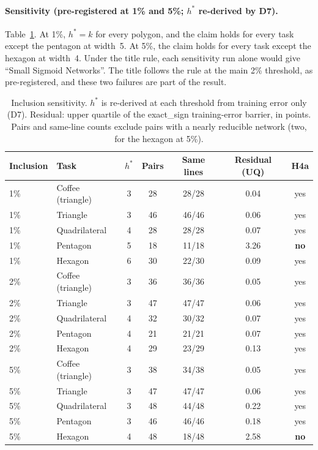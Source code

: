 \documentclass[11pt]{article}
\newcommand{\md}[1]{\textsf{#1}}
\begin{document}
\paragraph{Sensitivity (pre-registered at 1\% and 5\%; $h^*$ re-derived by D7).} Table~\ref{tab:v2sens}. At 1\%, $h^* = k$ for every polygon, and the claim holds for every task except the pentagon at width~5. At 5\%, the claim holds for every task except the hexagon at width~4. Under the title rule, each sensitivity run alone would give ``Small Sigmoid Networks''. The title follows the rule at the main 2\% threshold, as pre-registered, and these two failures are part of the result.

\begin{table}[t]
\centering\small
\caption{Inclusion sensitivity. $h^*$ is re-derived at each threshold from training error only (D7). Residual: upper quartile of the \md{exact\_sign} training-error barrier, in points. Pairs and same-line counts exclude pairs with a nearly reducible network (two, for the hexagon at 5\%).}
\label{tab:v2sens}
\begin{tabular}{@{}llccccc@{}}
\toprule
Inclusion & Task & $h^*$ & Pairs & Same lines & Residual (UQ) & H4a \\
\midrule
1\% & Coffee (triangle) & 3 & 28 & 28/28 & 0.04 & yes \\
1\% & Triangle & 3 & 46 & 46/46 & 0.06 & yes \\
1\% & Quadrilateral & 4 & 28 & 28/28 & 0.07 & yes \\
1\% & Pentagon & 5 & 18 & 11/18 & 3.26 & \textbf{no} \\
1\% & Hexagon & 6 & 30 & 22/30 & 0.09 & yes \\
\midrule
2\% & Coffee (triangle) & 3 & 36 & 36/36 & 0.05 & yes \\
2\% & Triangle & 3 & 47 & 47/47 & 0.06 & yes \\
2\% & Quadrilateral & 4 & 32 & 30/32 & 0.07 & yes \\
2\% & Pentagon & 4 & 21 & 21/21 & 0.07 & yes \\
2\% & Hexagon & 4 & 29 & 23/29 & 0.13 & yes \\
\midrule
5\% & Coffee (triangle) & 3 & 38 & 34/38 & 0.05 & yes \\
5\% & Triangle & 3 & 47 & 47/47 & 0.06 & yes \\
5\% & Quadrilateral & 3 & 48 & 44/48 & 0.22 & yes \\
5\% & Pentagon & 3 & 46 & 46/46 & 0.18 & yes \\
5\% & Hexagon & 4 & 48 & 18/48 & 2.58 & \textbf{no} \\
\bottomrule
\end{tabular}
\end{table}
\end{document}
